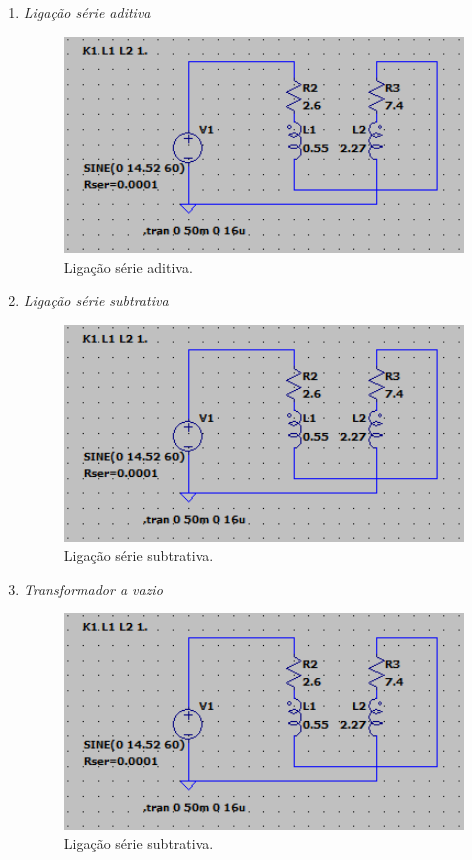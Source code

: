 \documentclass[a4paper,12pt,oneside,openany,table,xcdraw]{article}
\begin{document}
\begin{enumerate}

\item \emph{Ligação série aditiva}\\
\begin{figure}[H]
\centering
\captionsetup{font=scriptsize}
\includegraphics[width=11cm]{sim1}
\caption{Ligação série aditiva.}
\label{aditiva}
\end{figure}

\item \emph{Ligação série subtrativa}\\
\begin{figure}[H]
\centering
\captionsetup{font=scriptsize}
\includegraphics[width=11cm]{sim1}
\caption{Ligação série subtrativa.}
\label{aditiva}
\end{figure}

\item \emph{Transformador a vazio}\\
\begin{figure}[H]
\centering
\captionsetup{font=scriptsize}
\includegraphics[width=11cm]{sim1}
\caption{Ligação série subtrativa.}
\label{aditiva}
\end{figure}


\end{enumerate}
\end{document}
